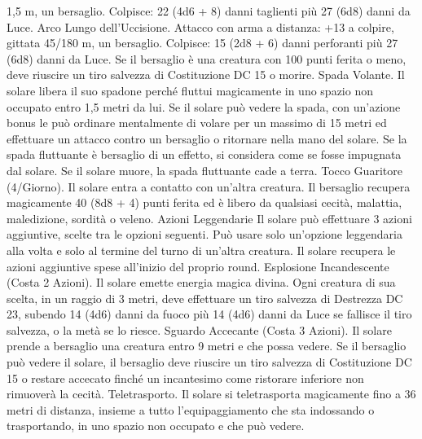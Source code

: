 \begin{multicols}{2}
1,5 m, un bersaglio.
Colpisce: 22 (4d6 + 8) danni taglienti più 27 (6d8) danni da Luce.
Arco Lungo dell’Uccisione. Attacco con arma a distanza: +13 a
colpire, gittata 45/180 m, un bersaglio.
Colpisce: 15 (2d8 + 6) danni perforanti più 27 (6d8) danni da Luce.
Se il bersaglio è una creatura con 100 punti ferita o meno, deve
riuscire un tiro salvezza di Costituzione DC 15 o morire.
Spada Volante. Il solare libera il suo spadone perché fluttui
magicamente in uno spazio non occupato entro 1,5 metri da lui.
Se il solare può vedere la spada, con un’azione bonus le può
ordinare mentalmente di volare per un massimo di 15 metri ed
effettuare un attacco contro un bersaglio o ritornare nella mano
del solare. Se la spada fluttuante è bersaglio di un effetto, si
considera come se fosse impugnata dal solare. Se il solare muore,
la spada fluttuante cade a terra.
Tocco Guaritore (4/Giorno). Il solare entra a contatto con
un’altra creatura. Il bersaglio recupera magicamente 40 (8d8 + 4)
punti ferita ed è libero da qualsiasi cecità, malattia, maledizione,
sordità o veleno.
Azioni Leggendarie
Il solare può effettuare 3 azioni aggiuntive, scelte tra le opzioni
seguenti. Può usare solo un’opzione leggendaria alla volta e solo
al termine del turno di un’altra creatura. Il solare recupera le
azioni aggiuntive spese all’inizio del proprio round.
Esplosione Incandescente (Costa 2 Azioni). Il solare emette
energia magica divina. Ogni creatura di sua scelta, in un raggio di 3
metri, deve effettuare un tiro salvezza di Destrezza DC 23, subendo
14 (4d6) danni da fuoco più 14 (4d6) danni da Luce se fallisce il tiro
salvezza, o la metà se lo riesce.
Sguardo Accecante (Costa 3 Azioni). Il solare prende a
bersaglio una creatura entro 9 metri e che possa vedere. Se il
bersaglio può vedere il solare, il bersaglio deve riuscire un tiro
salvezza di Costituzione DC 15 o restare accecato finché un
incantesimo come ristorare inferiore non rimuoverà la cecità.
Teletrasporto. Il solare si teletrasporta magicamente fino a 36 metri
di distanza, insieme a tutto l’equipaggiamento che sta indossando o
trasportando, in uno spazio non occupato e che può vedere.
 

\end{multicols}

